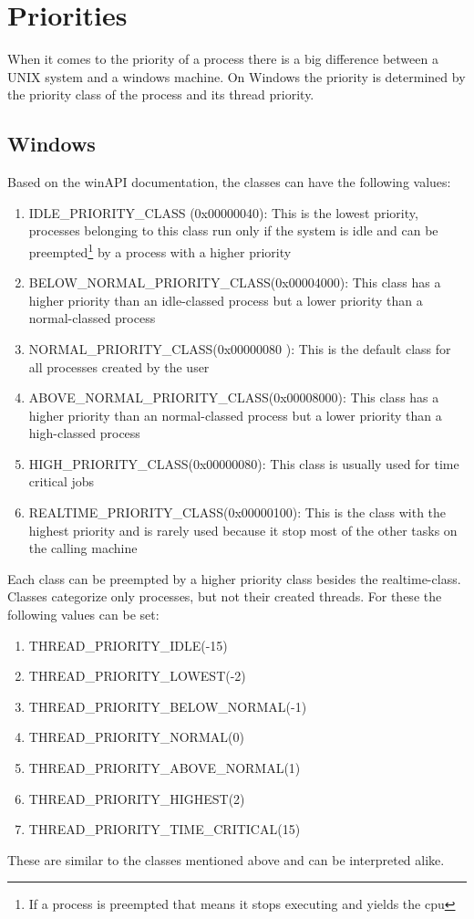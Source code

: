 \section{Priorities}
\label{priorities}
When it comes to the priority of a process there is a big difference between a UNIX system and a
windows machine. On Windows the priority is determined by the priority class of the process and its thread priority.\\
\subsection{Windows}
\label{winPrioClass}
Based on the winAPI documentation\cite{priorityClasses}, the classes can have the following values:
\begin{enumerate}
	\item IDLE\_PRIORITY\_CLASS (0x00000040): This is the lowest priority, processes belonging to this class run only if the system is idle and can be preempted\footnote{If a process is preempted that means it stops executing and yields the cpu} by a process with a higher priority
	\item BELOW\_NORMAL\_PRIORITY\_CLASS(0x00004000): This class has a higher priority than an idle-classed process but a lower priority than a normal-classed process 
	\item NORMAL\_PRIORITY\_CLASS(0x00000080
	): This is the default class for all processes created by the user
	\item ABOVE\_NORMAL\_PRIORITY\_CLASS(0x00008000): This class has a higher priority than an normal-classed process but a lower priority than a high-classed process
	\item HIGH\_PRIORITY\_CLASS(0x00000080): This class is usually used for time critical jobs
	\item REALTIME\_PRIORITY\_CLASS(0x00000100): This is the class with the highest priority and is rarely used because it stop most of the other tasks on the calling machine
\end{enumerate}
Each class can be preempted by a higher priority class besides the realtime-class. Classes categorize only processes, but not their created threads. For these the following values can be set:
\begin{enumerate}
	\item THREAD\_PRIORITY\_IDLE(-15)
	\item THREAD\_PRIORITY\_LOWEST(-2)
	\item THREAD\_PRIORITY\_BELOW\_NORMAL(-1)
	\item THREAD\_PRIORITY\_NORMAL(0)
	\item THREAD\_PRIORITY\_ABOVE\_NORMAL(1)
	\item THREAD\_PRIORITY\_HIGHEST(2)
	\item THREAD\_PRIORITY\_TIME\_CRITICAL(15)
\end{enumerate}
These are similar to the classes mentioned above and can be interpreted alike.\\
